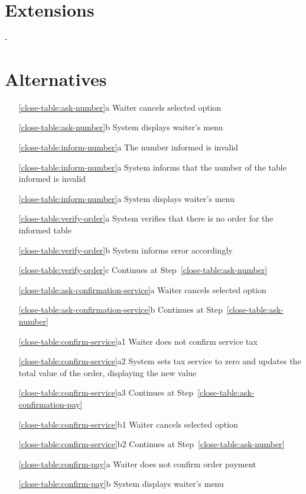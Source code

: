 \documentclass[a4paper,11pt,oneside]{book}
\newcommand{\cancel}[1]{#1 cancels selected option}
\newcommand{\menu}[1]{System displays #1's menu}
\newcommand{\goto}[1]{Continues at Step~\ref{#1}}
\begin{document}
\section{Extensions}

-

\section{Alternatives}

\begin{enumerate}
  \item [\ref{close-table:ask-number}a] \cancel{Waiter}
  \item [\ref{close-table:ask-number}b] \menu{waiter}
    \\
  \item [\ref{close-table:inform-number}a] The number informed is invalid
  \item [\ref{close-table:inform-number}a] System informs that the number of the table informed is invalid
  \item [\ref{close-table:inform-number}a] \menu{waiter}
    \\
  \item [\ref{close-table:verify-order}a] System verifies that there is no order for the informed table
  \item [\ref{close-table:verify-order}b] System informs error accordingly
  \item [\ref{close-table:verify-order}c] \goto{close-table:ask-number}
    \\
  \item [\ref{close-table:ask-confirmation-service}a] \cancel{Waiter}
  \item [\ref{close-table:ask-confirmation-service}b] \goto{close-table:ask-number}
    \\
  \item [\ref{close-table:confirm-service}a1] Waiter does not confirm service tax
  \item [\ref{close-table:confirm-service}a2] System sets tax service to zero and updates the total value of the order, displaying the new value
  \item [\ref{close-table:confirm-service}a3] \goto{close-table:ask-confirmation-pay}
    \\
  \item [\ref{close-table:confirm-service}b1] \cancel{Waiter}
  \item [\ref{close-table:confirm-service}b2] \goto{close-table:ask-number}
    \\
  \item [\ref{close-table:confirm-pay}a] Waiter does not confirm order payment
  \item [\ref{close-table:confirm-pay}b] \menu{waiter}

\end{enumerate}
\end{document}
